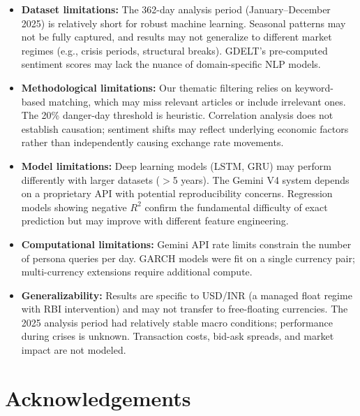 \documentclass[11pt]{article}
\begin{document}
\begin{itemize}[leftmargin=*]
    \item \textbf{Dataset limitations:} The 362-day analysis period (January--December 2025) is relatively short for robust machine learning. Seasonal patterns may not be fully captured, and results may not generalize to different market regimes (e.g., crisis periods, structural breaks). GDELT's pre-computed sentiment scores may lack the nuance of domain-specific NLP models.
    
    \item \textbf{Methodological limitations:} Our thematic filtering relies on keyword-based matching, which may miss relevant articles or include irrelevant ones. The 20\% danger-day threshold is heuristic. Correlation analysis does not establish causation; sentiment shifts may reflect underlying economic factors rather than independently causing exchange rate movements.
    
    \item \textbf{Model limitations:} Deep learning models (LSTM, GRU) may perform differently with larger datasets ($>$5 years). The Gemini V4 system depends on a proprietary API with potential reproducibility concerns. Regression models showing negative $R^2$ confirm the fundamental difficulty of exact prediction but may improve with different feature engineering.
    
    \item \textbf{Computational limitations:} Gemini API rate limits constrain the number of persona queries per day. GARCH models were fit on a single currency pair; multi-currency extensions require additional compute.
    
    \item \textbf{Generalizability:} Results are specific to USD/INR (a managed float regime with RBI intervention) and may not transfer to free-floating currencies. The 2025 analysis period had relatively stable macro conditions; performance during crises is unknown. Transaction costs, bid-ask spreads, and market impact are not modeled.
\end{itemize}

\section*{Acknowledgements}
\end{document}
